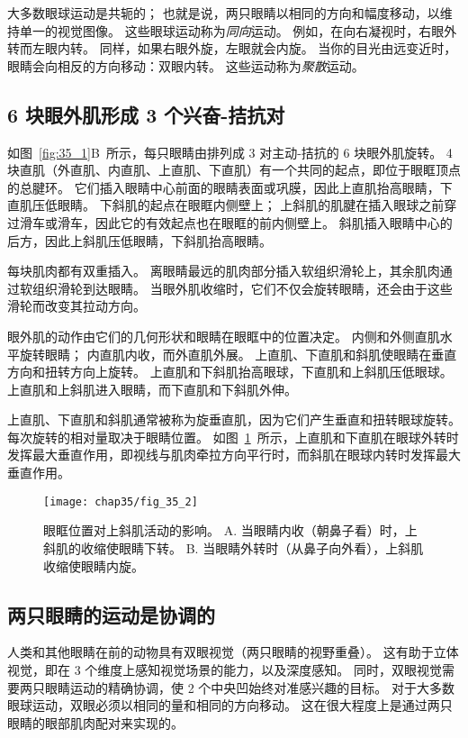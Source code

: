 大多数眼球运动是共轭的；
也就是说，两只眼睛以相同的方向和幅度移动，以维持单一的视觉图像。
这些眼球运动称为\textit{同向}运动。
例如，在向右凝视时，右眼外转而左眼内转。
同样，如果右眼外旋，左眼就会内旋。
当你的目光由远变近时，眼睛会向相反的方向移动：双眼内转。
这些运动称为\textit{聚散}运动。



\subsection{6 块眼外肌形成 3 个兴奋-拮抗对}

如图~\ref{fig:35_1}B~所示，每只眼睛由排列成 3 对主动-拮抗的 6 块眼外肌旋转。
4 块直肌（外直肌、内直肌、上直肌、下直肌）有一个共同的起点，即位于眼眶顶点的总腱环。
它们插入眼睛中心前面的眼睛表面或巩膜，因此上直肌抬高眼睛，下直肌压低眼睛。
下斜肌的起点在眼眶内侧壁上；
上斜肌的肌腱在插入眼球之前穿过滑车或滑车，因此它的有效起点也在眼眶的前内侧壁上。
斜肌插入眼睛中心的后方，因此上斜肌压低眼睛，下斜肌抬高眼睛。


每块肌肉都有双重插入。
离眼睛最远的肌肉部分插入软组织滑轮上，其余肌肉通过软组织滑轮到达眼睛。
当眼外肌收缩时，它们不仅会旋转眼睛，还会由于这些滑轮而改变其拉动方向。


眼外肌的动作由它们的几何形状和眼睛在眼眶中的位置决定。
内侧和外侧直肌水平旋转眼睛；
内直肌内收，而外直肌外展。
上直肌、下直肌和斜肌使眼睛在垂直方向和扭转方向上旋转。
上直肌和下斜肌抬高眼球，下直肌和上斜肌压低眼球。
上直肌和上斜肌进入眼睛，而下直肌和下斜肌外伸。


上直肌、下直肌和斜肌通常被称为旋垂直肌，因为它们产生垂直和扭转眼球旋转。
每次旋转的相对量取决于眼睛位置。
如图~\ref{fig:35_2}~所示，上直肌和下直肌在眼球外转时发挥最大垂直作用，即视线与肌肉牵拉方向平行时，而斜肌在眼球内转时发挥最大垂直作用。


\begin{figure}[htbp]
	\centering
	\texttt{[image: chap35/fig\_35\_2]}
	\caption{眼眶位置对上斜肌活动的影响。
		A. 当眼睛内收（朝鼻子看）时，上斜肌的收缩使眼睛下转。
		B. 当眼睛外转时（从鼻子向外看），上斜肌收缩使眼睛内旋。}
	\label{fig:35_2}
\end{figure}



\subsection{两只眼睛的运动是协调的}

人类和其他眼睛在前的动物具有双眼视觉（两只眼睛的视野重叠）。
这有助于立体视觉，即在 3 个维度上感知视觉场景的能力，以及深度感知。
同时，双眼视觉需要两只眼睛运动的精确协调，使 2 个中央凹始终对准感兴趣的目标。
对于大多数眼球运动，双眼必须以相同的量和相同的方向移动。 
这在很大程度上是通过两只眼睛的眼部肌肉配对来实现的。


